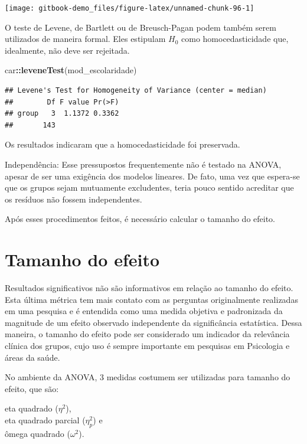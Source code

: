 \documentclass[
]{book}
\newenvironment{Shaded}{\begin{snugshade}}{\end{snugshade}}
\newcommand{\KeywordTok}[1]{\textcolor[rgb]{0.13,0.29,0.53}{\textbf{#1}}}
\newcommand{\NormalTok}[1]{#1}
\newcommand{\OperatorTok}[1]{\textcolor[rgb]{0.81,0.36,0.00}{\textbf{#1}}}
\begin{document}
\begin{center}\texttt{[image: gitbook-demo\_files/figure-latex/unnamed-chunk-96-1]} \end{center}

O teste de Levene, de Bartlett ou de Breusch-Pagan podem também serem
utilizados de maneira formal. Eles estipulam \(H_0\) como
homocedasticidade que, idealmente, não deve ser rejeitada.

\begin{Shaded}
\begin{Highlighting}[]
\NormalTok{car}\OperatorTok{::}\KeywordTok{leveneTest}\NormalTok{(mod_escolaridade)}
\end{Highlighting}
\end{Shaded}

\begin{verbatim}
## Levene's Test for Homogeneity of Variance (center = median)
##        Df F value Pr(>F)
## group   3  1.1372 0.3362
##       143
\end{verbatim}

Os resultados indicaram que a homocedasticidade foi preservada.

Independência: Esse pressupostos frequentemente não é testado na ANOVA,
apesar de ser uma exigência dos modelos lineares. De fato, uma vez que
espera-se que os grupos sejam mutuamente excludentes, teria pouco
sentido acreditar que os resíduos não fossem independentes.

Após esses procedimentos feitos, é necessário calcular o tamanho do
efeito.

\hypertarget{tamanho-do-efeito-3}{%
\section{Tamanho do efeito}\label{tamanho-do-efeito-3}}

Resultados significativos não são informativos em relação ao tamanho do
efeito. Esta última métrica tem mais contato com as perguntas
originalmente realizadas em uma pesquisa e é entendida como uma medida
objetiva e padronizada da magnitude de um efeito observado independente
da significância estatística. Dessa maneira, o tamanho do efeito pode
ser considerado um indicador da relevância clínica dos grupos, cujo uso
é sempre importante em pesquisas em Psicologia e áreas da saúde.

No ambiente da ANOVA, 3 medidas costumem ser utilizadas para tamanho do
efeito, que são:

eta quadrado (\(\eta^2\)),\\
eta quadrado parcial (\(\eta_p^2\)) e\\
ômega quadrado (\(\omega^2\)).
\end{document}
